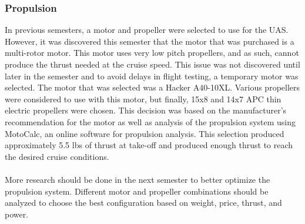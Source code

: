 \documentclass{article}
\begin{document}
\subsubsection{Propulsion}
In previous semesters, a motor and propeller were selected to use for the UAS. However, it was discovered this semester that the motor that was purchased is a multi-rotor motor. This motor uses very low pitch propellers, and as such, cannot produce the thrust needed at the cruise speed. This issue was not discovered until later in the semester and to avoid delays in flight testing, a temporary motor was selected. The motor that was selected was a Hacker A40-10XL. Various propellers were considered to use with this motor, but finally, 15x8 and 14x7 APC thin electric propellers were chosen. This decision was based on the manufacturer's recommendation for the motor as well as analysis of the propulsion system using MotoCalc, an online software for propulsion analysis. This selection produced approximately 5.5 lbs of thrust at take-off and produced enough thrust to reach the desired cruise conditions.\\\\
More research should be done in the next semester to better optimize the propulsion system. Different motor and propeller combinations should be analyzed to choose the best configuration based on weight, price, thrust, and power. 
\end{document}
